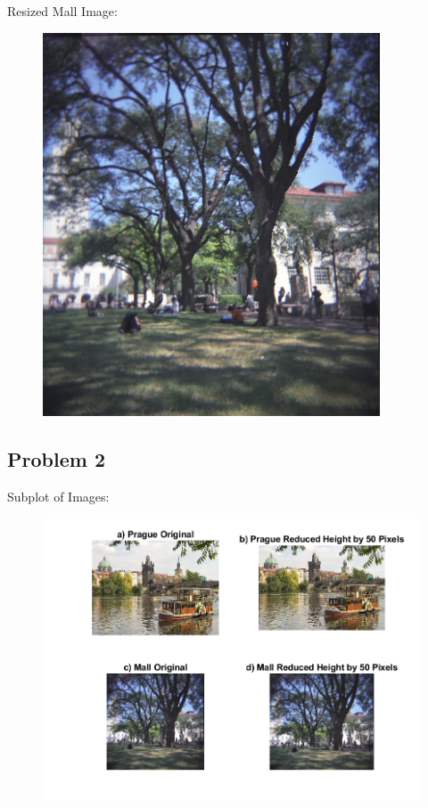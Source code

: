 \documentclass[12pt]{article}
\begin{document}
\noindent
Resized Mall Image:
\begin{figure}[H]
  \includegraphics[width=100mm]{outputReduceWidthMall.png}
  \label{fig:Resized Mall Image}
\end{figure}

\newpage
\subsection*{Problem 2}
Subplot of Images:
\begin{figure}[H]
  \includegraphics[width=\linewidth]{PS1_Q2.png}
  \label{fig:Subplot of Images}
\end{figure}
\end{document}
